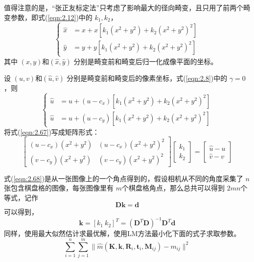 值得注意的是，“张正友标定法”只考虑了影响最大的径向畸变，且只用了前两个畸变参数，即式(\ref{eqn:2.12})中的 $k_1,k_2 $，
\begin{equation}
\label{eqn:2.66}
\left\{
\begin{aligned}
\hat{x} &= x + x[k_1(x^2 + y^2) + k_2(x^2 + y^2)^2] \\
\hat{y} &= y + y[k_1(x^2 + y^2) + k_2(x^2 + y^2)^2]
\end{aligned}
\right.
\end{equation}
其中 $(x,y)$和$(\hat{x},\hat{y}) $ 分别是畸变前和畸变后归一化成像平面的坐标。

设 $(u,v)$和$(\hat{u},\hat{v}) $ 分别是畸变前和畸变后的像素坐标，式(\ref{eqn:2.8})中的 $\gamma = 0 $ ，则
\begin{equation}
\label{eqn:2.67}
\left\{
\begin{aligned}
\hat u &= u + (u-c_x)[k_1(x^2+y^2)+k_2(x^2+y^2)^2] \\
\hat u &= u + (u-c_y)[k_1(x^2+y^2)+k_2(x^2+y^2)^2]
\end{aligned}
\right.
\end{equation}
将式(\ref{eqn:2.67})写成矩阵形式：
\begin{equation}
\label{eqn:2.68}
\left[
\begin{array}{cc}
(u-c_x)(x^2+y^2) & (u-c_x)(x^2+y^2)^2 \\
(v-c_y)(x^2+y^2) & (v-c_y)(x^2+y^2)^2
\end{array}
\right]
\left[
\begin{array}{c}
k_1 \\ k_2
\end{array}
\right]=
\left[
\begin{array}{c}
\hat u -u \\ \hat v -v
\end{array}
\right]
\end{equation}

式(\ref{eqn:2.68})是从一张图像上的一个角点得到的，假设相机从不同的角度采集了 $n$ 张包含棋盘格的图像，每张图像里有 $m$个棋盘格角点，那么总共可以得到 $2mn$个等式，记作
\begin{equation}
\label{eqn:2.69}
\bm{Dk} = \bm{d}
\end{equation}
可以得到，
\begin{equation}
\label{eqn:2.70}
\bm{k}=[k_1\ k_2]^T = (\bm{D}^T \bm{D})^{-1} \bm{D}^T\bm{d}
\end{equation}
同样，使用最大似然估计求最优解，使用LM方法最小化下面的式子求取参数。
\begin{equation}
\label{eqn:2.71}
\sum^n_{i=1}\sum^m_{j=1} \| \hat{m}( \bm{K},\bm{k},\bm{R}_i,\bm{t}_i,\bm{M}_{ij}  )-m_{ij} \|^2
\end{equation}

